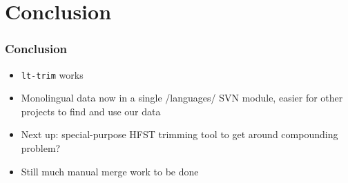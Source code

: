 \documentclass[notes=hide]{beamer}
\newcommand{\tool}[1]{\texttt{#1}}
\begin{document}
\section{Conclusion}
\begin{frame}
  \frametitle{Conclusion}
  \begin{itemize}
  \item \tool{lt-trim} works
  \item Monolingual data now in a single /languages/ SVN module,
    easier for other projects to find and use our data \\

  \item Next up: special-purpose HFST trimming tool to get around
    compounding problem?
  \item Still much manual merge work to be done
  \end{itemize}
\end{frame}

\end{document}
